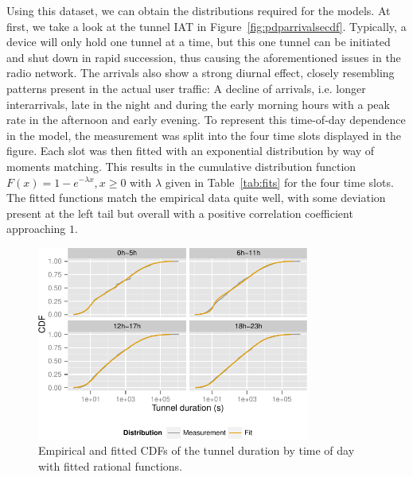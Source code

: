Using this dataset, we can obtain the distributions required for the models. At first, we take a look at the tunnel \gls{IAT} in Figure~\ref{fig:pdparrivalsecdf}.
Typically, a device will only hold one tunnel at a time, but this one tunnel can be initiated and shut down in rapid succession, thus causing the aforementioned issues in the radio network. The arrivals also show a strong diurnal effect, closely resembling patterns present in the actual user traffic: A decline of arrivals, i.e. longer interarrivals, late in the night and during the early morning hours with a peak rate in the afternoon and early evening. To represent this time-of-day dependence in the model, the measurement was split into the four time slots displayed in the figure. Each slot was then fitted with an exponential distribution by way of moments matching. This results in the cumulative distribution function $F(x) = 1- e^{-\lambda x}, x \geq 0$ with $\lambda$ given in Table~\ref{tab:fits} for the four time slots. The fitted functions match the empirical data quite well, with some deviation present at the left tail but overall with a positive correlation coefficient approaching $1$.

\begin{figure}[htb]
  \centering
  \includegraphics[width=0.8\textwidth]{images/timeslot-fits.pdf}
  \caption{Empirical and fitted CDFs of the tunnel duration by time of day with fitted rational functions.}
  \label{c4:fig:fittedsdurationlots}
\end{figure}

